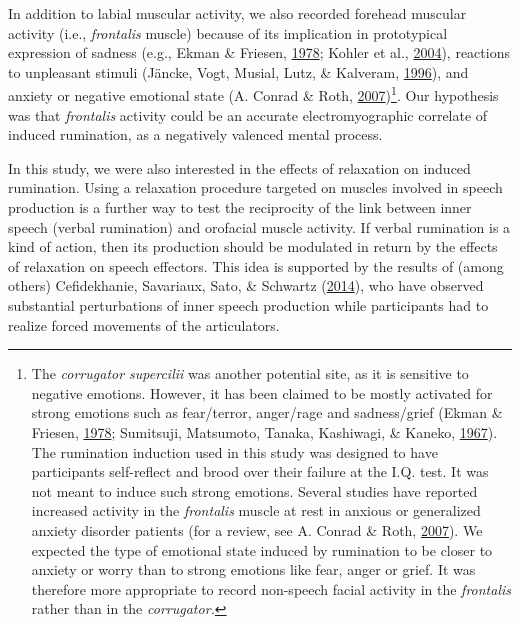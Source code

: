 \documentclass[a4paper,12pt,twoside,openright,oldfontcommands]{memoir}
\let\rmarkdownfootnote\footnote%
\def\footnote{\protect\rmarkdownfootnote}
\begin{document}
In addition to labial muscular activity, we also recorded forehead
muscular activity (i.e., \emph{frontalis} muscle) because of its
implication in prototypical expression of sadness (e.g., Ekman \&
Friesen, \protect\hyperlink{ref-ekman_facial_1978}{1978}; Kohler et al.,
\protect\hyperlink{ref-kohler_differences_2004}{2004}), reactions to
unpleasant stimuli (Jäncke, Vogt, Musial, Lutz, \& Kalveram,
\protect\hyperlink{ref-Jancke1996}{1996}), and anxiety or negative
emotional state (A. Conrad \& Roth,
\protect\hyperlink{ref-conrad_muscle_2007}{2007})\footnote{The
  \emph{corrugator supercilii} was another potential site, as it is
  sensitive to negative emotions. However, it has been claimed to be
  mostly activated for strong emotions such as fear/terror, anger/rage
  and sadness/grief (Ekman \& Friesen,
  \protect\hyperlink{ref-ekman_facial_1978}{1978}; Sumitsuji, Matsumoto,
  Tanaka, Kashiwagi, \& Kaneko,
  \protect\hyperlink{ref-sumitsuji_electromyographic_1967}{1967}). The
  rumination induction used in this study was designed to have
  participants self-reflect and brood over their failure at the I.Q.
  test. It was not meant to induce such strong emotions. Several studies
  have reported increased activity in the \emph{frontalis} muscle at
  rest in anxious or generalized anxiety disorder patients (for a
  review, see A. Conrad \& Roth,
  \protect\hyperlink{ref-conrad_muscle_2007}{2007}). We expected the
  type of emotional state induced by rumination to be closer to anxiety
  or worry than to strong emotions like fear, anger or grief. It was
  therefore more appropriate to record non-speech facial activity in the
  \emph{frontalis} rather than in the \emph{corrugator.}}. Our
hypothesis was that \emph{frontalis} activity could be an accurate
electromyographic correlate of induced rumination, as a negatively
valenced mental process.

In this study, we were also interested in the effects of relaxation on
induced rumination. Using a relaxation procedure targeted on muscles
involved in speech production is a further way to test the reciprocity
of the link between inner speech (verbal rumination) and orofacial
muscle activity. If verbal rumination is a kind of action, then its
production should be modulated in return by the effects of relaxation on
speech effectors. This idea is supported by the results of (among
others) Cefidekhanie, Savariaux, Sato, \& Schwartz
(\protect\hyperlink{ref-cefidekhanie_interaction_2014}{2014}), who have
observed substantial perturbations of inner speech production while
participants had to realize forced movements of the articulators.
\end{document}
